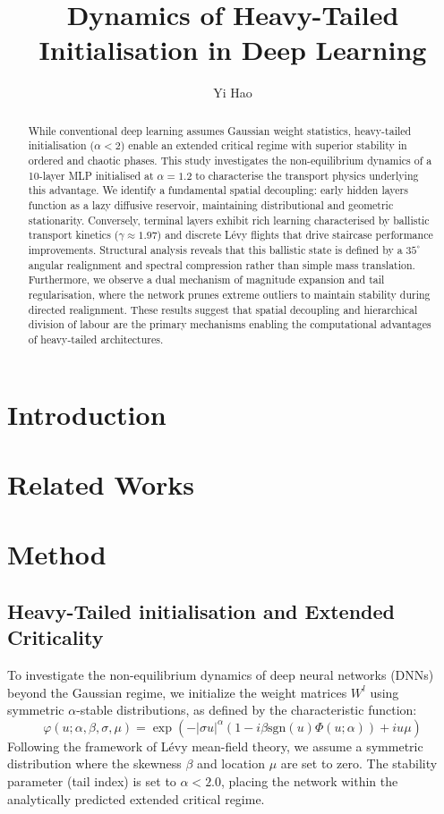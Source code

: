 \documentclass[11pt,a4paper]{article}
\author{Yi Hao}
\title{Dynamics of Heavy-Tailed Initialisation in Deep Learning}
\begin{document}
\maketitle
\begin{abstract}
	While conventional deep learning assumes Gaussian weight statistics, heavy-tailed initialisation ($\alpha < 2$) enable an extended critical regime with superior stability in ordered and chaotic phases. This study investigates the non-equilibrium dynamics of a 10-layer MLP initialised at $\alpha=1.2$ to characterise the transport physics underlying this advantage. We identify a fundamental spatial decoupling: early hidden layers function as a lazy diffusive reservoir, maintaining distributional and geometric stationarity. Conversely, terminal layers exhibit rich learning characterised by ballistic transport kinetics ($\gamma \approx 1.97$) and discrete L\'{e}vy flights that drive staircase performance improvements. Structural analysis reveals that this ballistic state is defined by a $35^\circ$ angular realignment and spectral compression rather than simple mass translation. Furthermore, we observe a dual mechanism of magnitude expansion and tail regularisation, where the network prunes extreme outliers to maintain stability during directed realignment. These results suggest that spatial decoupling and hierarchical division of labour are the primary mechanisms enabling the computational advantages of heavy-tailed architectures.
\end{abstract}
\section{Introduction}
\section{Related Works}
\section{Method}
\subsection{Heavy-Tailed initialisation and Extended Criticality}

To investigate the non-equilibrium dynamics of deep neural networks (DNNs) beyond the Gaussian regime, we initialize the weight matrices $W^l$ using symmetric $\alpha$-stable distributions, as defined by the characteristic function:
\begin{equation} \label{eq:levy_alpha}
    \varphi(u; \alpha, \beta, \sigma, \mu) = \exp\left(-|\sigma u|^\alpha (1 - i\beta \text{sgn}(u)\Phi(u; \alpha)) + iu\mu\right)
\end{equation}
Following the framework of Lévy mean-field theory, we assume a symmetric distribution where the skewness $\beta$ and location $\mu$ are set to zero. The stability parameter (tail index) is set to $\alpha < 2.0$, placing the network within the analytically predicted extended critical regime.
\end{document}
